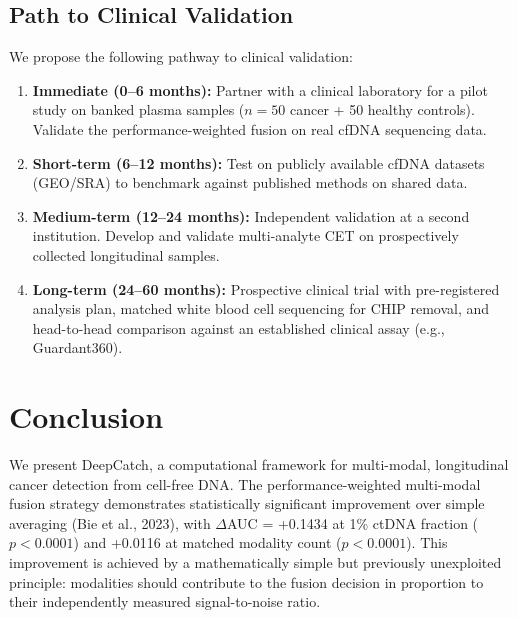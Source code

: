 \documentclass[10pt,a4paper]{article}
\begin{document}
\subsection{Path to Clinical Validation}

We propose the following pathway to clinical validation:

\begin{enumerate}[nosep]
\item \textbf{Immediate (0--6 months):} Partner with a clinical laboratory for a pilot study on banked plasma samples ($n = 50$ cancer + 50 healthy controls). Validate the performance-weighted fusion on real cfDNA sequencing data.

\item \textbf{Short-term (6--12 months):} Test on publicly available cfDNA datasets (GEO/SRA) to benchmark against published methods on shared data.

\item \textbf{Medium-term (12--24 months):} Independent validation at a second institution. Develop and validate multi-analyte CET on prospectively collected longitudinal samples.

\item \textbf{Long-term (24--60 months):} Prospective clinical trial with pre-registered analysis plan, matched white blood cell sequencing for CHIP removal, and head-to-head comparison against an established clinical assay (e.g., Guardant360).
\end{enumerate}


\section{Conclusion}

We present DeepCatch, a computational framework for multi-modal, longitudinal cancer detection from cell-free DNA. The performance-weighted multi-modal fusion strategy demonstrates statistically significant improvement over simple averaging (Bie et al., 2023), with $\Delta$AUC = +0.1434 at 1\% ctDNA fraction ($p < 0.0001$) and +0.0116 at matched modality count ($p < 0.0001$). This improvement is achieved by a mathematically simple but previously unexploited principle: modalities should contribute to the fusion decision in proportion to their independently measured signal-to-noise ratio.
\end{document}

